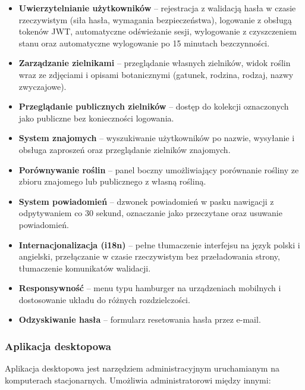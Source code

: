 \documentclass[12pt,a4paper]{article}
\begin{document}
\begin{itemize}[label=\textbullet, leftmargin=1.5cm]
    \item \textbf{Uwierzytelnianie u\.zytkownik\'ow} -- rejestracja z walidacj\k{a} has\l{}a w czasie rzeczywistym (si\l{}a has\l{}a, wymagania bezpiecze\'nstwa), logowanie z obs\l{}ug\k{a} token\'ow JWT, automatyczne od\'swie\.zanie sesji, wylogowanie z czyszczeniem stanu oraz automatyczne wylogowanie po 15 minutach bezczynno\'sci.
    \item \textbf{Zarz\k{a}dzanie zielnikami} -- przegl\k{a}danie w\l{}asnych zielnik\'ow, widok ro\'slin wraz ze zdj\k{e}ciami i opisami botanicznymi (gatunek, rodzina, rodzaj, nazwy zwyczajowe).
    \item \textbf{Przegl\k{a}danie publicznych zielnik\'ow} -- dost\k{e}p do kolekcji oznaczonych jako publiczne bez konieczno\'sci logowania.
    \item \textbf{System znajomych} -- wyszukiwanie u\.zytkownik\'ow po nazwie, wysy\l{}anie i obs\l{}uga zaprosze\'n oraz przegl\k{a}danie zielnik\'ow znajomych.
    \item \textbf{Por\'ownywanie ro\'slin} -- panel boczny umo\.zliwiaj\k{a}cy por\'ownanie ro\'sliny ze zbioru znajomego lub publicznego z w\l{}asn\k{a} ro\'slin\k{a}.
    \item \textbf{System powiadomie\'n} -- dzwonek powiadomie\'n w pasku nawigacji z odpytywaniem co 30 sekund, oznaczanie jako przeczytane oraz usuwanie powiadomie\'n.
    \item \textbf{Internacjonalizacja (i18n)} -- pe\l{}ne t\l{}umaczenie interfejsu na j\k{e}zyk polski i angielski, prze\l{}\k{a}czanie w czasie rzeczywistym bez prze\l{}adowania strony, t\l{}umaczenie komunikat\'ow walidacji.
    \item \textbf{Responsywno\'s\'c} -- menu typu hamburger na urz\k{a}dzeniach mobilnych i dostosowanie uk\l{}adu do r\'o\.znych rozdzielczo\'sci.
    \item \textbf{Odzyskiwanie has\l{}a} -- formularz resetowania has\l{}a przez e-mail.
\end{itemize}

\subsubsection{Aplikacja desktopowa}

Aplikacja desktopowa jest narz\k{e}dziem administracyjnym uruchamianym na komputerach stacjonarnych. Umo\.zliwia administratorowi mi\k{e}dzy innymi:
\end{document}
